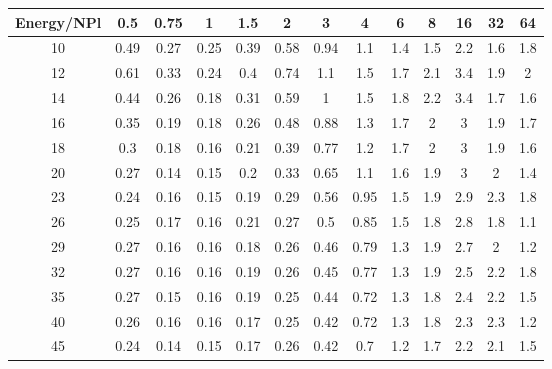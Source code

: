 \begin{tabular}{c c c c c c c c c c c c c}
\hline
\hline
 Energy/NPl &    0.5 &   0.75 &      1 &    1.5 &      2 &      3 &      4 &      6 &      8 &     16 &     32 &     64  \\ 
\hline
    10  &   0.49  &   0.27  &   0.25  &   0.39  &   0.58  &   0.94  &    1.1  &    1.4  &    1.5  &    2.2  &    1.6  &    1.8  \\
    12  &   0.61  &   0.33  &   0.24  &    0.4  &   0.74  &    1.1  &    1.5  &    1.7  &    2.1  &    3.4  &    1.9  &      2  \\
    14  &   0.44  &   0.26  &   0.18  &   0.31  &   0.59  &      1  &    1.5  &    1.8  &    2.2  &    3.4  &    1.7  &    1.6  \\
    16  &   0.35  &   0.19  &   0.18  &   0.26  &   0.48  &   0.88  &    1.3  &    1.7  &      2  &      3  &    1.9  &    1.7  \\
    18  &    0.3  &   0.18  &   0.16  &   0.21  &   0.39  &   0.77  &    1.2  &    1.7  &      2  &      3  &    1.9  &    1.6  \\
    20  &   0.27  &   0.14  &   0.15  &    0.2  &   0.33  &   0.65  &    1.1  &    1.6  &    1.9  &      3  &      2  &    1.4  \\
    23  &   0.24  &   0.16  &   0.15  &   0.19  &   0.29  &   0.56  &   0.95  &    1.5  &    1.9  &    2.9  &    2.3  &    1.8  \\
    26  &   0.25  &   0.17  &   0.16  &   0.21  &   0.27  &    0.5  &   0.85  &    1.5  &    1.8  &    2.8  &    1.8  &    1.1  \\
    29  &   0.27  &   0.16  &   0.16  &   0.18  &   0.26  &   0.46  &   0.79  &    1.3  &    1.9  &    2.7  &      2  &    1.2  \\
    32  &   0.27  &   0.16  &   0.16  &   0.19  &   0.26  &   0.45  &   0.77  &    1.3  &    1.9  &    2.5  &    2.2  &    1.8  \\
    35  &   0.27  &   0.15  &   0.16  &   0.19  &   0.25  &   0.44  &   0.72  &    1.3  &    1.8  &    2.4  &    2.2  &    1.5  \\
    40  &   0.26  &   0.16  &   0.16  &   0.17  &   0.25  &   0.42  &   0.72  &    1.3  &    1.8  &    2.3  &    2.3  &    1.2  \\
    45  &   0.24  &   0.14  &   0.15  &   0.17  &   0.26  &   0.42  &    0.7  &    1.2  &    1.7  &    2.2  &    2.1  &    1.5  \\
\hline
\hline
\end{tabular}
